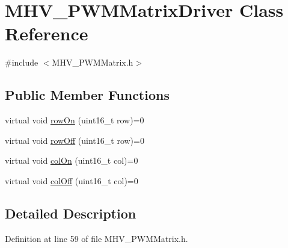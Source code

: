 \hypertarget{class_m_h_v___p_w_m_matrix_driver}{
\section{\-M\-H\-V\-\_\-\-P\-W\-M\-Matrix\-Driver \-Class \-Reference}
\label{class_m_h_v___p_w_m_matrix_driver}
}


{\ttfamily \#include $<$\-M\-H\-V\-\_\-\-P\-W\-M\-Matrix.\-h$>$}

\subsection*{\-Public \-Member \-Functions}
\begin{DoxyCompactItemize}
\item 
virtual void \hyperlink{class_m_h_v___p_w_m_matrix_driver_a29010e47aae4f8fd18062be2a3e36aa7}{row\-On} (uint16\-\_\-t row)=0
\item 
virtual void \hyperlink{class_m_h_v___p_w_m_matrix_driver_ab1ebb00f0b24bc73c209cf543c38d9ed}{row\-Off} (uint16\-\_\-t row)=0
\item 
virtual void \hyperlink{class_m_h_v___p_w_m_matrix_driver_a3f5060e28a17075891a46ccf5dc0445a}{col\-On} (uint16\-\_\-t col)=0
\item 
virtual void \hyperlink{class_m_h_v___p_w_m_matrix_driver_a654484d86d2111713f82c30b87780348}{col\-Off} (uint16\-\_\-t col)=0
\end{DoxyCompactItemize}


\subsection{\-Detailed \-Description}


\-Definition at line 59 of file \-M\-H\-V\-\_\-\-P\-W\-M\-Matrix.\-h.




